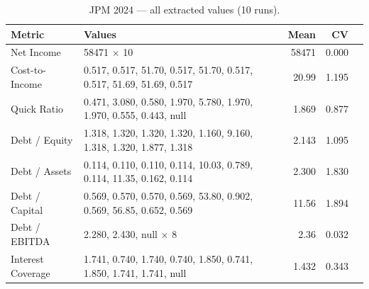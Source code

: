 \documentclass[12pt, a4paper]{article}
\newcommand{\cmark}{\textcolor{green!60!black}{\ding{51}}}  %
\newcommand{\xmark}{\textcolor{red!70!black}{\ding{55}}}    %
\begin{document}
\begin{table}[H]
\centering\small
\caption{JPM 2024 --- all extracted values (10 runs).}
\label{tab:jpm-raw}
\begin{tabular}{lp{8.5cm}rrc}
\toprule
\textbf{Metric} & \textbf{Values} & \textbf{Mean} & \textbf{CV} & \\
\midrule
Net Income         & 58471 $\times$ 10                                                 & 58471 & 0.000 & \cmark \\
Cost-to-Income     & 0.517, 0.517, 51.70, 0.517, 51.70, 0.517, 0.517, 51.69, 51.69, 0.517 & 20.99 & 1.195 & \xmark \\
Quick Ratio        & 0.471, 3.080, 0.580, 1.970, 5.780, 1.970, 1.970, 0.555, 0.443, null & 1.869 & 0.877 & \xmark \\
Debt / Equity      & 1.318, 1.320, 1.320, 1.320, 1.160, 9.160, 1.318, 1.320, 1.877, 1.318 & 2.143 & 1.095 & \xmark \\
Debt / Assets      & 0.114, 0.110, 0.110, 0.114, 10.03, 0.789, 0.114, 11.35, 0.162, 0.114 & 2.300 & 1.830 & \xmark \\
Debt / Capital     & 0.569, 0.570, 0.570, 0.569, 53.80, 0.902, 0.569, 56.85, 0.652, 0.569 & 11.56 & 1.894 & \xmark \\
Debt / EBITDA      & 2.280, 2.430, null $\times$ 8                                     &  2.36 & 0.032 & \xmark \\
Interest Coverage  & 1.741, 0.740, 1.740, 0.740, 1.850, 0.741, 1.850, 1.741, 1.741, null & 1.432 & 0.343 & \xmark \\
\bottomrule
\end{tabular}
\end{table}
\end{document}
